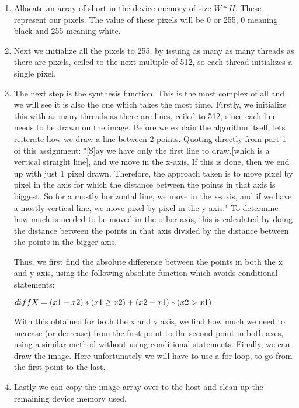 \begin{enumerate}
	\item Allocate an array of short in the device memory of size $W*H$. These represent our pixels. The value of these pixels will be 0 or 255, 0 meaning black and 255 meaning white.
	
	\item Next we initialize all the pixels to 255, by issuing as many as many threads as there are pixels, ceiled to the next multiple of 512, so each thread initializes a single pixel.
	
	\item The next step is the synthesis function. This is the most complex of all and we will see it is also the one which takes the most time. Firstly, we initialize this with as many threads as there are lines, ceiled to 512, since each line needs to be drawn on the image. Before we explain the algorithm itself, lets reiterate how we draw a line between 2 points. Quoting directly from part 1 of this assignment: "[S]ay we have only the first line to draw,[which is a vertical straight line], and we move in the x-axis. If this is done, then we end up with just 1 pixel drawn. Therefore, the approach taken is to move pixel by pixel in the axis for which the distance between the points in that axis is biggest. So for a mostly horizontal line, we move in the x-axis, and if we have a mostly vertical line, we move pixel by pixel in the y-axis." To determine how much is needed to be moved in the other axis, this is calculated by doing the distance between the points in that axis divided by the distance between the points in the bigger axis.
	
	Thus, we first find the absolute difference between the points in both the x and y axis, using the following absolute function which avoids conditional statements:
	
	$diffX = (x1-x2)*(x1\ge x2) +\\ (x2-x1)*(x2>x1)$
	
	With this obtained for both the x and y axis, we find how much we need to increase (or decrease) from the first point to the second point in both axes, using a similar method without using conditional statements. Finally, we can draw the image. Here unfortunately we will have to use a for loop, to go from the first point to the last.
	
	\item Lastly we can copy the image array over to the host and clean up the remaining device memory used.
\end{enumerate}